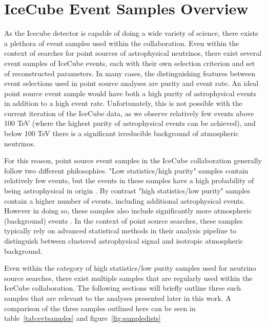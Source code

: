 \section{IceCube Event Samples Overview}
As the Icecube detector is capable of doing a wide variety of science, there exists a plethora of event samples used within the collaboration. Even within the context of searches for point sources of astrophysical neutrinos, there exist several event samples of IceCube events, each with their own selection criterion and set of reconstructed parameters. In many cases, the distinguishing features between event selections used in point source analyses are purity and event rate. An ideal point source event sample would have both a high purity of astrophysical events in addition to a high event rate. Unfortunately, this is not possible with the current iteration of the IceCube data, as we observe relatively few events above 100 TeV (where the highest purity of astrophysical events can be achieved), and below 100 TeV there is a significant irreducible background of atmospheric neutrinos. 

For this reason, point source event samples in the IceCube collaboration generally follow two different philosophies. "Low statistics/high purity" samples contain relatively few events, but the events in these samples have a high probability of being astrophysical in origin \cite{Estes} \cite{hese7yr}. By contrast "high statistics/low purity" samples contain a higher number of events, including additional astrophysical events. However in doing so, these samples also include significantly more atmospheric (background) events \cite{stettner2019measurement} \cite{10yr_tint}. In the context of point source searches, these samples typically rely on advanced statistical methods in their analysis pipeline to distinguish between clustered astrophysical signal and isotropic atmospheric background. 

Even within the category of high statistics/low purity samples used for neutrino source searches, there exist multiple samples that are regularly used within the IceCube collaboration. The following sections will briefly outline three such samples that are relevant to the analyses presented later in this work.  A comparison of the three samples outlined here can be seen in table~\ref{tab:evtsamples} and figure~\ref{fig:sampledists}

